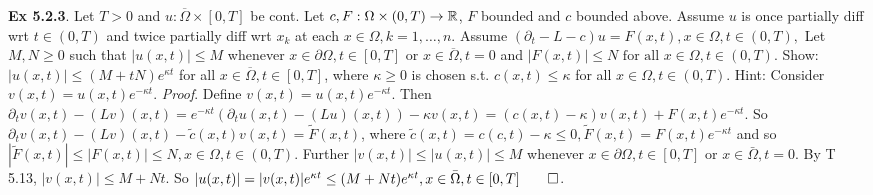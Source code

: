 {\bf Ex 5.2.3}.  Let $T>0$ and $u: \overline{\Omega}\times [0,T]$ be cont.  Let $c, F : \Omega \times (0,T) \rightarrow \mathbb{R}$, $F$ bounded and $c$ bounded above.   Assume $u$ is once partially diff wrt $t \in (0,T)$ and twice partially diff wrt $x_k$ at each $x \in \Omega, k=1,\dots, n$. Assume $(\partial_t - L-c)u = F(x,t), x \in \Omega, t \in (0,T),$ Let $M, N \geq 0$ such that $|u(x,t)| \leq M$ whenever $x \in \partial \Omega, t \in [0,T] \text{ or } x \in \overline{\Omega}, t = 0$ and $|F(x,t)| \leq N \text{ for all } x \in \Omega, t \in (0,T).$ Show:  $|u(x,t)| \leq (M + tN)e^{\kappa t}$ for all $x \in \overline{\Omega}, t \in [0,T]$, where $\kappa \geq 0$ is chosen s.t. $c(x,t) \leq \kappa$ for all $x \in \Omega, t \in (0,T)$. Hint:  Consider $v(x,t)=u(x,t)e^{-\kappa t}$.
{\it Proof}. Define $v(x,t)=u(x,t)e^{-\kappa t}$.  Then $\partial_tv(x,t) - (Lv)(x,t) = e^{-\kappa t}(\partial_tu(x,t) - (Lu)(x,t))-\kappa v(x,t)= (c(x,t) - \kappa)v(x,t) + F(x,t)e^{-\kappa t}$. So $\partial_tv(x,t) - (Lv)(x,t) - \tilde{c}(x,t) v(x,t)= \tilde{F}(x,t)$, where $\tilde{c}(x,t) = c(c,t) - \kappa \leq 0, \tilde{F}(x,t)= F(x,t)e^{-\kappa t}$ and so $|\tilde{F}(x,t)| \leq |F(x,t)|\leq N, x \in \Omega, t \in (0,T)$. Further $|v(x,t)| \leq |u(x,t)| \leq M$ whenever $x \in \partial \Omega, t \in [0,T]$ or $x \in \bar{\Omega}, t = 0$. By T 5.13, $|v(x,t)| \leq M + N t$. So 
 $|u(x,t)|=|v(x,t)|e^{\kappa t} \leq (M+Nt)e^{\kappa t}, x \in \bar{\Omega}, t \in [0,T] \qed$. 